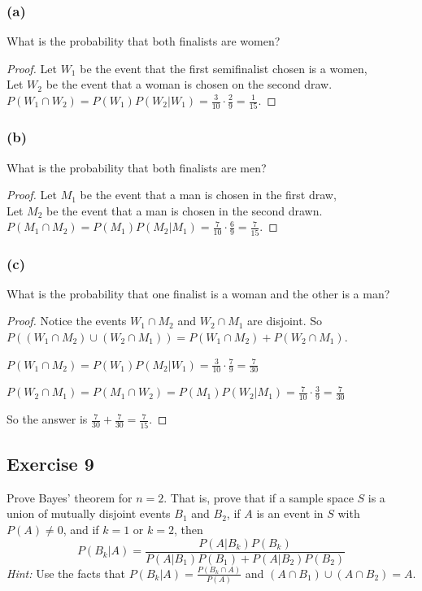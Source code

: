 \documentclass[14pt]{extarticle}
\begin{document}
\subsubsection{(a)}
What is the probability that both finalists are women?
\begin{proof}
Let \(W_1\) be the event that the first semifinalist chosen is a women, \\
Let \(W_2\) be the event that a woman is chosen on the second draw. \\
\(P(W_1 \cap W_2) = P(W_1)P(W_2 | W_1) = \frac{3}{10} \cdot \frac{2}{9} = \frac{1}{15}\).
\end{proof}

\subsubsection{(b)}
What is the probability that both finalists are men?
\begin{proof}
Let \(M_1\) be the event that a man is chosen in the first draw, \\
Let \(M_2\) be the event that a man is chosen in the second drawn. \\
\(P(M_1 \cap M_2) = P(M_1)P(M_2 | M_1) = \frac{7}{10} \cdot \frac{6}{9} = \frac{7}{15}\).
\end{proof}

\subsubsection{(c)}
What is the probability that one finalist is a woman and the other is a man?

\begin{proof}
Notice the events \(W_1 \cap M_2\) and \(W_2 \cap M_1\) are disjoint. So \(P((W_1 \cap M_2) \cup (W_2 \cap M_1)) = 
P(W_1 \cap M_2) + P(W_2 \cap M_1)\).

\(P(W_1 \cap M_2) = P(W_1)P(M_2 | W_1) = \frac{3}{10} \cdot \frac{7}{9} = \frac{7}{30}\)

\(P(W_2 \cap M_1) = P(M_1 \cap W_2) = P(M_1)P(W_2 | M_1) = \frac{7}{10} \cdot \frac{3}{9} = \frac{7}{30}\)

So the answer is \(\frac{7}{30} + \frac{7}{30} = \frac{7}{15}\).
\end{proof}

\subsection{Exercise 9}
Prove Bayes’ theorem for \(n = 2\). That is, prove that if a sample space \(S\) is a union of mutually disjoint events 
\(B_1\) and \(B_2\), if \(A\) is an event in \(S\) with \(P(A) \neq 0\), and if \(k = 1\) or \(k = 2\), then 
\[
P(B_k | A) = \frac{P(A| B_k)P(B_k)}{P(A | B_1) P(B_1) + P(A | B_2) P(B_2)}
\]
{\it Hint:} Use the facts that \(P(B_k | A) = \frac{P(B_k \cap A)}{P(A)}\) and \((A \cap B_1) \cup (A \cap B_2) = A\).
\end{document}
